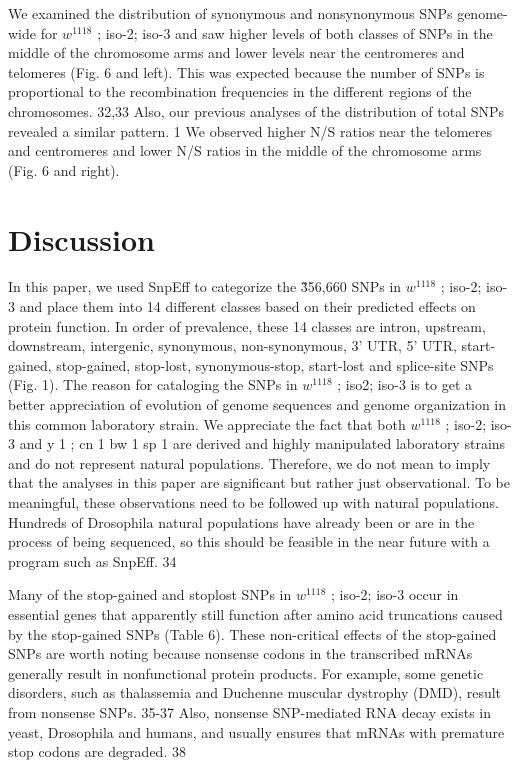 We examined the distribution of synonymous and nonsynonymous SNPs genome-wide for $w^{1118}$ ; iso-2; iso-3 and saw higher levels of both classes of SNPs in the middle of the chromosome arms and lower levels near the centromeres and telomeres (Fig.  6 and left). This was expected because the number of SNPs is proportional to the recombination frequencies in the different regions of the chromosomes. 32,33 Also, our previous analyses of the distribution of total SNPs revealed a similar pattern. 1 We observed higher N/S ratios near the telomeres and centromeres and lower N/S ratios in the middle of the chromosome arms (Fig.  6 and right).

\section{Discussion}

In this paper, we used SnpEff to categorize the \~356,660 SNPs in $w^{1118}$ ; iso-2; iso-3 and place them into 14 different classes based on their predicted effects on protein function. In order of prevalence, these 14 classes are intron, upstream, downstream, intergenic, synonymous, non-synonymous, 3' UTR, 5' UTR, start-gained, stop-gained, stop-lost, synonymous-stop, start-lost and splice-site SNPs (Fig. 1). The reason for cataloging the SNPs in $w^{1118}$ ; iso2; iso-3 is to get a better appreciation of evolution of genome sequences and genome organization in this common laboratory strain. We appreciate the fact that both $w^{1118}$ ; iso-2; iso-3 and y 1 ; cn 1 bw 1 sp 1 are derived and highly manipulated laboratory strains and do not represent natural populations. Therefore, we do not mean to imply that the analyses in this paper are significant but rather just observational. To be meaningful, these observations need to be followed up with natural populations. Hundreds of Drosophila natural populations have already been or are in the process of being sequenced, so this should be feasible in the near future with a program such as SnpEff. 34

Many of the stop-gained and stoplost SNPs in $w^{1118}$ ; iso-2; iso-3 occur in essential genes that apparently still function after amino acid truncations caused by the stop-gained SNPs (Table 6). These non-critical effects of the stop-gained SNPs are worth noting because nonsense codons in the transcribed mRNAs generally result in nonfunctional protein products. For example, some genetic disorders, such as thalassemia and Duchenne muscular dystrophy (DMD), result from nonsense SNPs. 35-37 Also, nonsense SNP-mediated RNA decay exists in yeast, Drosophila and humans, and usually ensures that mRNAs with premature stop codons are degraded. 38

